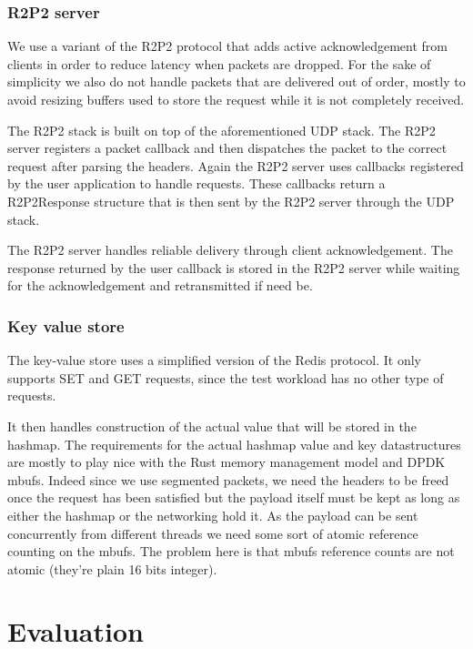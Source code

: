 \documentclass[11pt]{book}
\begin{document}
\subsubsection{R2P2 server}

We use a variant of the R2P2 protocol that adds active acknowledgement
from clients in order to reduce latency when packets are dropped. For
the sake of simplicity we also do not handle packets that are
delivered out of order, mostly to avoid resizing buffers used to store
the request while it is not completely received.

The R2P2 stack is built on top of the aforementioned UDP stack. The
R2P2 server registers a packet callback and then dispatches the packet
to the correct request after parsing the headers. Again the R2P2
server uses callbacks registered by the user application to handle
requests. These callbacks return a R2P2Response structure that is then
sent by the R2P2 server through the UDP stack.

The R2P2 server handles reliable delivery through client
acknowledgement. The response returned by the user callback is stored
in the R2P2 server while waiting for the acknowledgement and
retransmitted if need be.

\subsubsection{Key value store}

The key-value store uses a simplified version of the Redis
protocol. It only supports SET and GET requests, since the test
workload has no other type of requests.


It then handles construction of the actual value that will be stored
in the hashmap. The requirements for the actual hashmap value and key
datastructures are mostly to play nice with the Rust memory management
model and DPDK mbufs. Indeed since we use segmented packets, we need
the headers to be freed once the request has been satisfied but the
payload itself must be kept as long as either the hashmap or the
networking hold it. As the payload can be sent concurrently from
different threads we need some sort of atomic reference counting on
the mbufs. The problem here is that mbufs reference counts are not
atomic (they're plain 16 bits integer).

\section{Evaluation}
\end{document}
